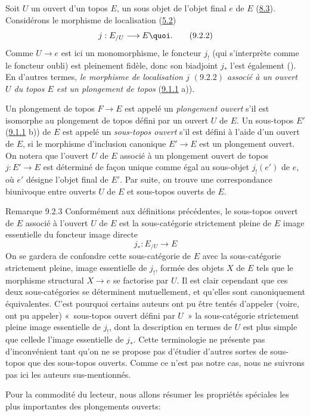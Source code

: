 \documentclass[10pt]{../fichiers-configuration-latex/smfart}
\begin{document}
\subsubsection{}

Soit $U$ un ouvert d'un topos $E$, \ie un sous objet de l'objet
final $e$ de $E$ (\hyperref[IV.def8.3]{8.3}). Considérons le morphisme de
localisation (\hyperref[IV.subsec5.2]{5.2})
\begin{equation*}
j:E_{/U}\longrightarrow E{\quoi}.\tag{9.2.2}
\end{equation*}
Comme $U\rightarrow e$ est ici un monomorphisme, le foncteur $j_{!}$
(qui s'interprète comme le foncteur oubli) est pleinement fidèle,
donc son biadjoint $j_\ast$ l'est également (). En d'autres
termes, \emph{le morphisme de localisation $j$ $(9.2.2)$ associé à
un ouvert $U$ du topos $E$ est un plongement de topos}
(\hyperref[IV.def9.1.1]{9.1.1} a)).

Un plongement de topos $F\rightarrow E$ est appelé un
\emph{plongement ouvert} s'il est isomorphe au plongement de topos
défini par un ouvert $U$ de $E$. Un sous-topos $E'$
(\hyperref[IV.def9.1.1]{9.1.1} b)) de $E$ est appelé un \emph{sous-topos ouvert}
s'il est défini à l'aide d'un ouvert de $E$, \ie si le morphisme
d'inclusion canonique $E'\rightarrow E$ est un plongement ouvert. On
notera que l'ouvert $U$ de $E$ associé à un plongement ouvert de
topos $j:E'\rightarrow E$ est déterminé de façon unique comme
égal au sous-objet $j_{!}(e')$ de $e$, où $e'$ désigne l'objet final
de $E'$. Par suite, on trouve une correspondance biunivoque entre
ouverts $U$ de $E$ et sous-topos ouverts de $E$.

\begin{enonce*}[remark]{Remarque 9.2.3}
Conformément aux définitions précédentes, le
sous-topos ouvert de
$E$ associé à l'ouvert $U$ de $E$ est la sous-catégorie strictement
pleine de $E$ image essentielle du foncteur image directe
$$
j_{\ast}:E_{/U}\longrightarrow E
$$
On se gardera de confondre cette sous-catégorie de $E$ avec la
sous-catégorie strictement pleine, image essentielle de $j_{!}$,
formée des objets $X$ de $E$ tels que le morphisme structural
$X\rightarrow e$ se factorise par $U$. Il est clair cependant que
ces deux sous-catégories se déterminent mutuellement, et qu'elles
sont canoniquement équivalentes. C'est pourquoi certains auteurs ont
pu être tentés d'appeler (voire, ont pu appeler) « sous-topos
ouvert défini par $U$ »  la sous-catégorie strictement pleine
image essentielle de $j_{!}$, dont la description en termes de $U$
est plus simple que celle\pageoriginale de l'image essentielle de
$j_{\ast}$. Cette terminologie ne présente pas d'inconvénient tant
qu'on ne se propose pas d'étudier d'autres sortes de sous-topos que
des sous-topos ouverts. Comme ce n'est pas notre cas, nous ne
suivrons pas ici les auteurs sus-mentionnés.

Pour la commodité du lecteur, nous allons résumer les propriétés
spéciales les plus importantes des plongements ouverts:
\end{enonce*}
\end{document}
